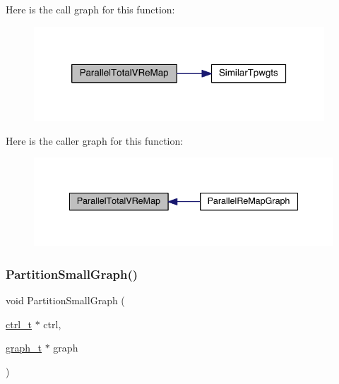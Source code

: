 Here is the call graph for this function\+:\nopagebreak
\begin{figure}[H]
\begin{center}
\leavevmode
\includegraphics[width=308pt]{a00951_acba5c2146105c8a70af8cd9c3c0cb721_cgraph}
\end{center}
\end{figure}
Here is the caller graph for this function\+:\nopagebreak
\begin{figure}[H]
\begin{center}
\leavevmode
\includegraphics[width=338pt]{a00951_acba5c2146105c8a70af8cd9c3c0cb721_icgraph}
\end{center}
\end{figure}
\mbox{\label{a00951_a2d6d8a17368be648ff848288a9d2d514}} 
\subsubsection{\texorpdfstring{Partition\+Small\+Graph()}{PartitionSmallGraph()}}
{\footnotesize\ttfamily void Partition\+Small\+Graph (\begin{DoxyParamCaption}\item[{\hyperlink{a00742}{ctrl\+\_\+t} $\ast$}]{ctrl,  }\item[{\hyperlink{a00734}{graph\+\_\+t} $\ast$}]{graph }\end{DoxyParamCaption})}

